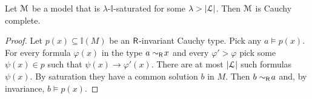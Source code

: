 \documentclass[10pt,oneside]{amsproc}
\begin{document}
\begin{fact}
  Let ${\EuScript M}$ be a model that is $\lambda$-$\mathds{I}$-saturated for some $\lambda>|{\EuScript L}|$.
  Then ${\EuScript M}$ is Cauchy complete.
\end{fact}

\begin{proof}  
  Let $p(x)\subseteq\mathds{I}(M)$ be an ${\sf R}$-invariant Cauchy type.
  Pick any $a\models p(x)$.
  For every formula $\varphi(x)$ in the type $a\sim_{\sf R}\!x$ and every $\varphi'>\varphi$ pick some $\psi(x)\in p$ such that $\psi(x)\rightarrow\varphi'(x)$.
  There are at most $|{\EuScript L}|$ such formulas $\psi(x)$.
  By saturation they have a common solution $b$ in $M$.
  Then $b\sim_{\sf R}\!a$ and, by invariance, $b\models p(x)$.
\end{proof}


\begin{comment}
The pr ${\EuScript M}$oof of the following proposition uses the same compactness argument used for Proposition~\ref{prop_LHapprox1}.

\begin{proposition}\label{prop_sim_approx}
  Let $\varphi(x)\in\mathds{I}(U)$ be ${\sf R}$-invariant.
  For every given $\varphi'>\varphi$ there are some $a_i\models\varphi(x)$, some terms $t_i(x,z)$, and some compact $C_i\subseteq R^2\smallsetminus\Delta$ such that 

  \ceq{\hfill\varphi(x)}{\rightarrow}{\bigwedge_{i=1,\dots,n}\tilde\tau_{t_i,C_i}(x,a_i)\ \ \rightarrow\ \ \varphi'(x),}

  where

  \ceq{\hfill\tilde\tau_{t,C}(x,z)}{=}{\existsM z\ \langle t(x,z),t(y,z)\rangle\in C.}

\end{proposition}

\begin{proof}
  As $\neg\varphi(x)$ is ${\sf R}$-invariant 

  \ceq{\hfill\neg\varphi(x)}{\leftrightarrow}{\bigvee_{a\,\models\neg\varphi(x)}\big\{\tau_{t,\Delta}(x,a)\ :\ t(x,z)\textrm{ a term}\big\}.}

  By Fact~\ref{fact_compactness_imp} and Lemma~\ref{lem_interpolation}

    \ceq{\hfill\neg\varphi(x)}{\leftrightarrow}{\bigvee_{\neg\tilde\tau_{t,C}(a,x)\rightarrow\neg\varphi(x)}\neg\tilde\tau_{t,C}(x,a),}

  where $C$ ranges over the compact subsetes of $R^2\smallsetminus\Delta$.
  Equivalently

  \ceq{\hfill\varphi(x)}{\leftrightarrow}{\bigwedge_{\varphi(x)\rightarrow\tilde\tau_{t,C}(x,a)}\tilde\tau_{t,C}(x,a).}

  By compactness, see Fact~\ref{fact_compactness_imp}, there are some some $a_i,t_i,C_i$ as in the lemma such that 

  \ceq{\hfill\varphi(x)}{\rightarrow}{\bigwedge_{i=1,\dots,n}\tilde\tau_{t_i,C_i}(x,a_i)\ \ \rightarrow\ \ \varphi'(x)}
\end{proof}
  
\end{comment}
\end{document}
